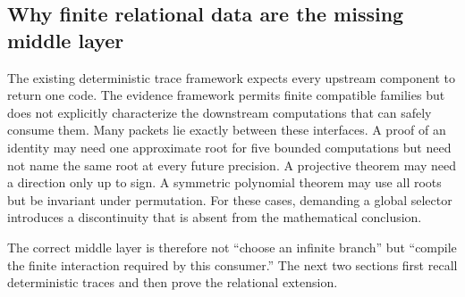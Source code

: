 \subsection{Why finite relational data are the missing middle layer}

The existing deterministic trace framework expects every upstream component to return one code.  The evidence framework permits finite compatible families but does not explicitly characterize the downstream computations that can safely consume them.  Many packets lie exactly between these interfaces.  A proof of an identity may need one approximate root for five bounded computations but need not name the same root at every future precision.  A projective theorem may need a direction only up to sign.  A symmetric polynomial theorem may use all roots but be invariant under permutation.  For these cases, demanding a global selector introduces a discontinuity that is absent from the mathematical conclusion.

The correct middle layer is therefore not ``choose an infinite branch'' but ``compile the finite interaction required by this consumer.''  The next two sections first recall deterministic traces and then prove the relational extension.
